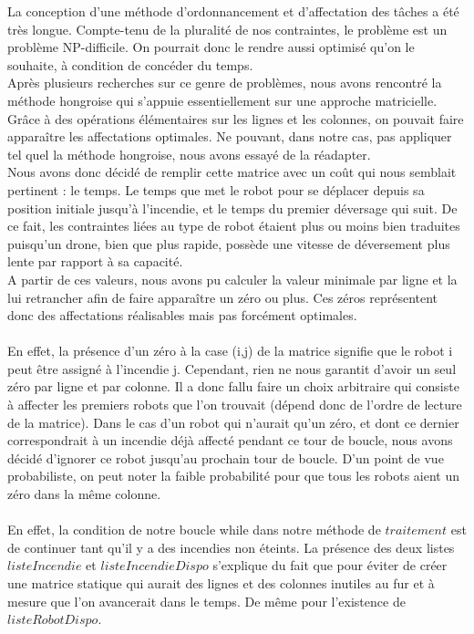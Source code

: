 \documentclass[12pt,a4paper]{article}
\begin{document}
La conception d’une méthode d’ordonnancement et d’affectation des tâches a été très longue. Compte-tenu de la pluralité de nos contraintes, le problème est un problème NP-difficile. On pourrait donc le rendre aussi optimisé qu’on le souhaite, à condition de concéder du temps. \\
Après plusieurs recherches sur ce genre de problèmes, nous avons rencontré la méthode hongroise qui s’appuie essentiellement sur une approche matricielle. Grâce à des opérations élémentaires sur les lignes et les colonnes, on pouvait faire apparaître les affectations optimales. Ne pouvant, dans notre cas, pas appliquer tel quel la méthode hongroise, nous avons essayé de la réadapter. \\

Nous avons donc décidé de remplir cette matrice avec un coût  qui nous semblait pertinent : le temps. Le temps que met le robot pour se déplacer depuis sa position initiale jusqu’à l’incendie, et le temps du premier déversage qui suit. De ce fait, les contraintes liées au type de robot étaient plus ou moins bien traduites puisqu’un drone, bien que plus rapide, possède une vitesse de déversement plus lente par rapport à sa capacité.\\
A partir de ces valeurs, nous avons pu calculer la valeur minimale par ligne et la lui retrancher afin de faire apparaître un zéro ou plus. Ces zéros représentent donc des affectations réalisables mais pas forcément optimales.\\\\
En effet, la présence d'un zéro à la case (i,j) de la matrice signifie que le robot i peut être assigné à l'incendie j. Cependant, rien ne nous garantit d'avoir un seul zéro par ligne et par colonne. Il a donc fallu faire un choix arbitraire qui consiste à affecter les premiers robots que l'on trouvait (dépend donc de l'ordre de lecture de la matrice).
Dans le cas d'un robot qui n'aurait qu'un zéro, et dont ce dernier correspondrait à un incendie déjà affecté pendant ce tour de boucle, nous avons décidé d'ignorer ce robot jusqu'au prochain tour de boucle. D'un point de vue probabiliste, on peut noter la faible probabilité pour que tous les robots aient un zéro dans la même colonne.\\\\
En effet, la condition de notre boucle while dans notre méthode de $traitement$ est de continuer tant qu'il y a des incendies non éteints. La présence des deux listes $listeIncendie$ et $listeIncendieDispo$ s'explique du fait que pour éviter de créer une matrice statique qui aurait des lignes et des colonnes inutiles au fur et à mesure que l'on avancerait dans le temps. De même pour l'existence de $listeRobotDispo$.\\\\
\end{document}
